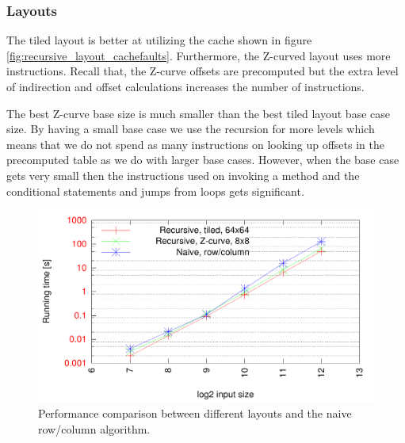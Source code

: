 \subsubsection{Layouts}

The tiled layout is better at utilizing the cache shown in figure \ref{fig:recursive_layout_cachefaults}. Furthermore, the Z-curved layout uses more instructions. Recall that, the Z-curve offsets are precomputed but the extra level of indirection and offset calculations increases the number of instructions.

The best Z-curve base size is much smaller than the best tiled layout base case size. By having a small base case we use the recursion for more levels which means that we do not spend as many instructions on looking up offsets in the precomputed table as we do with larger base cases. However, when the base case gets very small then the instructions used on invoking a method and the conditional statements and jumps from loops gets significant.





\begin{figure}[h!]
  \centering
  \includegraphics[width=\textwidth]{"../project2/gnuplots/recursive_performance"}
  \caption{Performance comparison between different layouts and the naive row/column algorithm.}
  \label{fig:recursive_layout_performance}
\end{figure}

